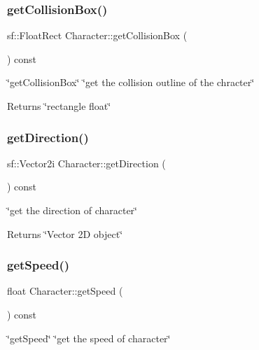 \subsubsection{\texorpdfstring{get\+Collision\+Box()}{getCollisionBox()}}
{\footnotesize\ttfamily sf\+::\+Float\+Rect Character\+::get\+Collision\+Box (\begin{DoxyParamCaption}{ }\end{DoxyParamCaption}) const}



\char`\"{}get\+Collision\+Box\char`\"{}  \char`\"{}get the collision outline of the chracter\char`\"{} 

\begin{DoxyReturn}{Returns}
\char`\"{}rectangle float\char`\"{} 
\end{DoxyReturn}
\mbox{\label{classCharacter_ae8147e847ec305534ef4f2652f3541de}} 
\subsubsection{\texorpdfstring{get\+Direction()}{getDirection()}}
{\footnotesize\ttfamily sf\+::\+Vector2i Character\+::get\+Direction (\begin{DoxyParamCaption}{ }\end{DoxyParamCaption}) const}



\char`\"{}get the direction of character\char`\"{} 

\begin{DoxyReturn}{Returns}
\char`\"{}\+Vector 2\+D object\char`\"{} 
\end{DoxyReturn}
\mbox{\label{classCharacter_afb7791a8c122e8b88244f0a1a54506c0}} 
\subsubsection{\texorpdfstring{get\+Speed()}{getSpeed()}}
{\footnotesize\ttfamily float Character\+::get\+Speed (\begin{DoxyParamCaption}{ }\end{DoxyParamCaption}) const}



\char`\"{}get\+Speed\char`\"{}  \char`\"{}get the speed of character\char`\"{} 


